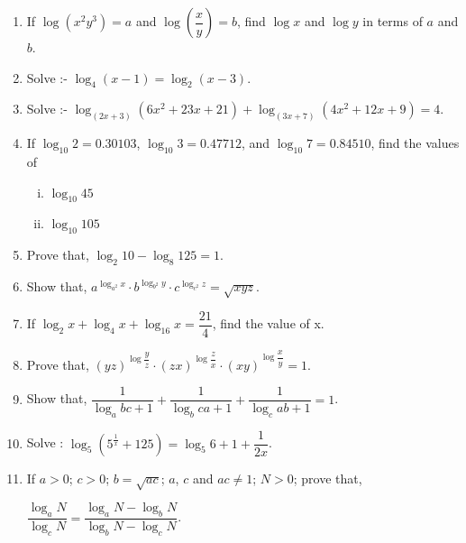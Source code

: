 \documentclass[11pt, a4paper]{article}
\begin{document}
\begin{enumerate}
     	\item If $ \log (x^2y^3) = a $ and $ \log \left(\dfrac{x}{y}\right) = b $, find $\log x $ and $\log y $ in terms of $a$ and $b$. 
     	
     	\item Solve :- $\log_4 (x-1) = \log_2 (x-3) $.
     	
     	\item Solve :- $ \log_{(2x+3)} \left( 6x^2 + 23x + 21 \right) + \log_{(3x+7)} \left( 4x^2 + 12x + 9 \right) = 4 $.
     	
     	\item If $ \log_{10} 2 = 0.30103 $, $\log_{10} 3 = 0.47712$, and $\log_{10} 7 = 0.84510 $, find the values of \begin{enumerate}[(i)]
     		\item $ \log_{10} 45 $
     		\item $ \log_{10} 105 $
     	\end{enumerate}
     	
     	\item Prove that, $ \log_2 10 - \log_8 125 = 1 $.
     	
     	\item Show that, $ a^{\log_{a^2} x} \cdot b^{\log_{b^2} y} \cdot c^{\log_{c^2} z}  = \sqrt{xyz}$.
     	
     	\item If $ \log_2 x + \log_4 x + \log_{16} x = \dfrac{21}{4} $, find the value of x.
     	
     	\item Prove that, $ (yz)^{\log \dfrac{y}{z}} \cdot (zx)^{\log \dfrac{z}{x}} \cdot (xy)^{\log \dfrac{x}{y}} = 1 $.
     	
     	\item Show that, $ \dfrac{1}{\log_a bc + 1} + \dfrac{1}{\log_b ca + 1} + \dfrac{1}{\log_c ab + 1} = 1 $.
     	
     	\item Solve : $ \log_5 (5^{\frac{1}{x}} + 125) = \log_5 6 + 1 + \dfrac{1}{2x} $.
     	
     	\item If $a>0$; $c>0$; $b=\sqrt{ac}$; $a$, $c$ and $ ac \neq1  $; $N>0$; prove that, \begin{center}
     	
     	
     $\dfrac{\log_a N}{\log_c N} = \dfrac{\log_a N - \log_b N}{\log_b N - \log_c N}$.
     \end{center}
     

\end{enumerate}
\end{document}
